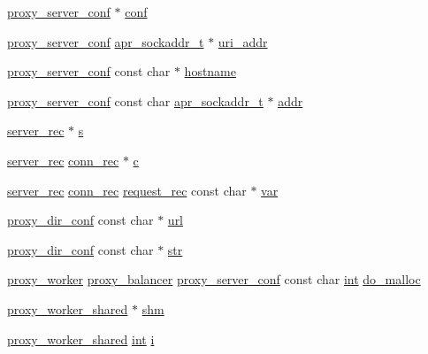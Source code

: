 \begin{DoxyCompactItemize}
\item 
\hyperlink{structproxy__server__conf}{proxy\+\_\+server\+\_\+conf} $\ast$ \hyperlink{group__MOD__PROXY_ga4d7edd451c4bb8ed9ce9012e5dea2b14}{conf}
\item 
\hyperlink{structproxy__server__conf}{proxy\+\_\+server\+\_\+conf} \hyperlink{structapr__sockaddr__t}{apr\+\_\+sockaddr\+\_\+t} $\ast$ \hyperlink{group__MOD__PROXY_ga9eb39b5a7ddf76ee0a5f645b3237ed01}{uri\+\_\+addr}
\item 
\hyperlink{structproxy__server__conf}{proxy\+\_\+server\+\_\+conf} const char $\ast$ \hyperlink{group__MOD__PROXY_gaf5f02fc1c17e9b5b11fd66faaebd6405}{hostname}
\item 
\hyperlink{structproxy__server__conf}{proxy\+\_\+server\+\_\+conf} const char \hyperlink{structapr__sockaddr__t}{apr\+\_\+sockaddr\+\_\+t} $\ast$ \hyperlink{group__MOD__PROXY_ga6d5ecaf37baca2c5cd2dfca34109da7e}{addr}
\item 
\hyperlink{structserver__rec}{server\+\_\+rec} $\ast$ \hyperlink{group__MOD__PROXY_gac4d70082e9974ebc2dabf813f28a90e6}{s}
\item 
\hyperlink{structserver__rec}{server\+\_\+rec} \hyperlink{structconn__rec}{conn\+\_\+rec} $\ast$ \hyperlink{group__MOD__PROXY_ga3c85ea2e13450e203c2cfba3172effdc}{c}
\item 
\hyperlink{structserver__rec}{server\+\_\+rec} \hyperlink{structconn__rec}{conn\+\_\+rec} \hyperlink{structrequest__rec}{request\+\_\+rec} const char $\ast$ \hyperlink{group__MOD__PROXY_ga81bb7fed3eaa4dd24455759f1cb26176}{var}
\item 
\hyperlink{structproxy__dir__conf}{proxy\+\_\+dir\+\_\+conf} const char $\ast$ \hyperlink{group__MOD__PROXY_ga05d2db9f2dd75d18170f192bd1cc9b4e}{url}
\item 
\hyperlink{structproxy__dir__conf}{proxy\+\_\+dir\+\_\+conf} const char $\ast$ \hyperlink{group__MOD__PROXY_gad31fd05b9422a86641717c95c3008ae9}{str}
\item 
\hyperlink{structproxy__worker}{proxy\+\_\+worker} \hyperlink{structproxy__balancer}{proxy\+\_\+balancer} \hyperlink{structproxy__server__conf}{proxy\+\_\+server\+\_\+conf} const char \hyperlink{pcre_8txt_a42dfa4ff673c82d8efe7144098fbc198}{int} \hyperlink{group__MOD__PROXY_gaef29aa61c962c5e54a57f23da686176b}{do\+\_\+malloc}
\item 
\hyperlink{structproxy__worker__shared}{proxy\+\_\+worker\+\_\+shared} $\ast$ \hyperlink{group__MOD__PROXY_gaec43f3d756b1bc21a10fe86270cb2f44}{shm}
\item 
\hyperlink{structproxy__worker__shared}{proxy\+\_\+worker\+\_\+shared} \hyperlink{pcre_8txt_a42dfa4ff673c82d8efe7144098fbc198}{int} \hyperlink{group__MOD__PROXY_ga38403a0592eb8018a3ad61aef0f7ca2c}{i}

\end{DoxyCompactItemize}
